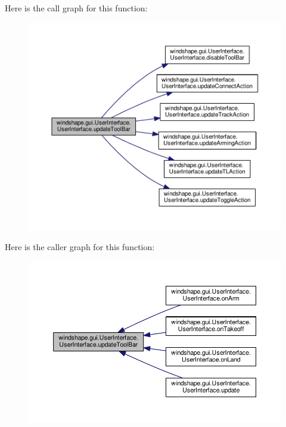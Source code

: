 Here is the call graph for this function\+:\nopagebreak
\begin{figure}[H]
\begin{center}
\leavevmode
\includegraphics[width=350pt]{classwindshape_1_1gui_1_1_user_interface_1_1_user_interface_a0c543aa08f2f27a8c65a3c6de8963f85_cgraph}
\end{center}
\end{figure}
Here is the caller graph for this function\+:\nopagebreak
\begin{figure}[H]
\begin{center}
\leavevmode
\includegraphics[width=350pt]{classwindshape_1_1gui_1_1_user_interface_1_1_user_interface_a0c543aa08f2f27a8c65a3c6de8963f85_icgraph}
\end{center}
\end{figure}
\mbox{\label{classwindshape_1_1gui_1_1_user_interface_1_1_user_interface_adaa93924687bf5f63c18839c154a8d6d}} 
